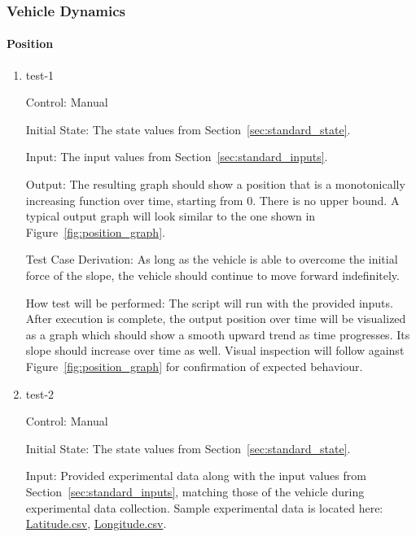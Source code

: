 \documentclass[12pt, titlepage]{article}
\begin{document}
\subsubsection{Vehicle Dynamics}


\paragraph{Position}

\begin{enumerate}
  
  \item{test-1\\}
  
  Control: Manual
            
  Initial State: The state values from Section~\ref{sec:standard_state}.
  
  Input: The input values from Section~\ref{sec:standard_inputs}.
            
  Output: The resulting graph should show a position that is a monotonically increasing function over time, starting from 0. There is no upper bound. A typical output graph will look similar to the one shown in Figure~\ref{fig:position_graph}.
  
  Test Case Derivation: As long as the vehicle is able to overcome the initial force of the slope, the vehicle should continue to move forward indefinitely.
  
  How test will be performed: The script will run with the provided inputs. After execution is complete, the output position over time will be visualized as a graph which should show a smooth upward trend as time progresses. Its slope should increase over time as well. Visual inspection will follow against Figure~\ref{fig:position_graph} for confirmation of expected behaviour.
  
  \item{test-2\\}

  Control: Manual

  Initial State: The state values from Section~\ref{sec:standard_state}.
  
  Input: Provided experimental data along with the input values from Section~\ref{sec:standard_inputs}, matching those of the vehicle during experimental data collection. Sample experimental data is located here: \href{https://github.com/gr812b/CVT-Simulator/experimental-data/GPS_LATITUDE.csv}{Latitude.csv}, \href{https://github.com/gr812b/CVT-Simulator/experimental-data/GPS_LONGITUDE.csv}{Longitude.csv}.


\end{enumerate}
\end{document}
